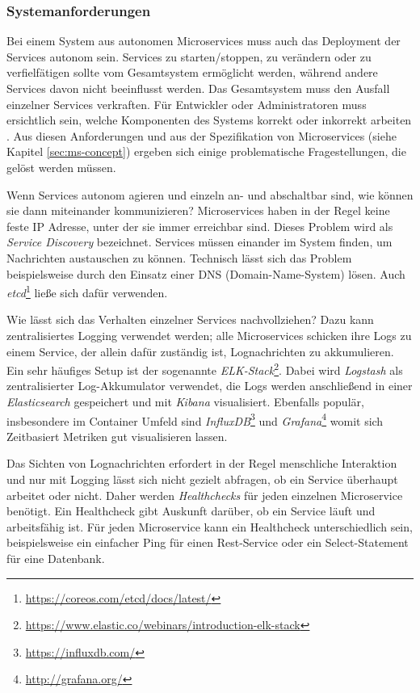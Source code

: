 \subsubsection{Systemanforderungen}
\label{subsec:arch-requirements}

Bei einem System aus autonomen Microservices muss auch das Deployment der Services autonom sein. Services zu starten/stoppen, zu verändern oder zu verfielfätigen sollte vom Gesamtsystem ermöglicht werden, während andere Services davon nicht beeinflusst werden. Das Gesamtsystem muss den Ausfall einzelner Services verkraften. Für Entwickler oder Administratoren muss ersichtlich sein, welche Komponenten des Systems korrekt oder inkorrekt arbeiten \cite{newman2015}. Aus diesen Anforderungen und aus der Spezifikation von Microservices (siehe Kapitel \ref{sec:ms-concept}) ergeben sich einige problematische Fragestellungen, die gelöst werden müssen.

Wenn Services autonom agieren und einzeln an- und abschaltbar sind, wie können sie dann miteinander kommunizieren? Microservices haben in der Regel keine feste IP Adresse, unter der sie immer erreichbar sind. Dieses Problem wird als \textit{Service Discovery} bezeichnet. Services müssen einander im System finden, um Nachrichten austauschen zu können. Technisch lässt sich das Problem beispielsweise durch den Einsatz einer DNS (Domain-Name-System) lösen. Auch \textit{etcd}\footnote{\url{https://coreos.com/etcd/docs/latest/}} ließe sich dafür verwenden.

Wie lässt sich das Verhalten einzelner Services nachvollziehen? Dazu kann zentralisiertes Logging verwendet werden; alle Microservices schicken ihre Logs zu einem Service, der allein dafür zuständig ist, Lognachrichten zu akkumulieren. Ein sehr häufiges Setup ist der sogenannte \textit{ELK-Stack}\footnote{\url{https://www.elastic.co/webinars/introduction-elk-stack}}. Dabei wird \textit{Logstash} als zentralisierter Log-Akkumulator verwendet, die Logs werden anschließend in einer \textit{Elasticsearch} gespeichert und mit \textit{Kibana} visualisiert. Ebenfalls populär, insbesondere im Container Umfeld sind \textit{InfluxDB}\footnote{\url{https://influxdb.com/}} und \textit{Grafana}\footnote{\url{http://grafana.org/}} womit sich Zeitbasiert Metriken gut visualisieren lassen.

Das Sichten von Lognachrichten erfordert in der Regel menschliche Interaktion und nur mit Logging lässt sich nicht gezielt abfragen, ob ein Service überhaupt arbeitet oder nicht. Daher werden \textit{Healthchecks} für jeden einzelnen Microservice benötigt. Ein Healthcheck gibt Auskunft darüber, ob ein Service läuft und arbeitsfähig ist. Für jeden Microservice kann ein Healthcheck unterschiedlich sein, beispielsweise ein einfacher Ping für einen Rest-Service oder ein Select-Statement für eine Datenbank.

